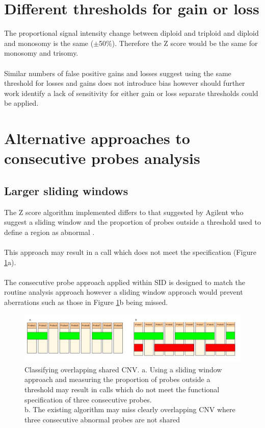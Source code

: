 \section{Different thresholds for gain or loss}
The proportional signal intensity change between diploid and triploid and diploid and monosomy is the same ($\pm$50\%). Therefore the Z score would be the same for monosomy and trisomy. 
\paragraph*{}
Similar numbers of false positive gains and losses suggest using the same threshold for losses and gains does not introduce bias however should further work identify a lack of sensitivity for either gain or loss separate thresholds could be applied.

\section{Alternative approaches to consecutive probes analysis}
\subsection{Larger sliding windows}
The Z score algorithm implemented differs to that suggested by Agilent who suggest a sliding window and the proportion of probes outside a threshold used to define a region as abnormal \cite{agilent_technologies_agilent_2011}.
\paragraph*{}
This approach may result in a call which does not meet the specification (Figure \ref{fig:incorrectcallandalternatecomb}a).
\paragraph*{}
The consecutive probe approach applied within SID is designed to match the routine analysis approach however a sliding window approach would prevent aberrations such as those in Figure \ref{fig:incorrectcallandalternatecomb}b being missed.

\begin{figure}[h]
\centering
\includegraphics[width=1\linewidth]{./Figures/incorrectcallandalternatecomb}
\caption[Classifying overlapping shared CNV]{Classifying overlapping shared CNV. a. Using a sliding window approach and measuring the proportion of probes outside a threshold may result in calls which do not meet the functional specification of three consecutive probes.\\
b. The existing algorithm may miss clearly overlapping CNV where three consecutive abnormal probes are not shared}
\label{fig:incorrectcallandalternatecomb}
\end{figure}

